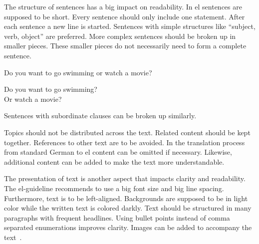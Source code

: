 The structure of sentences has a big impact on readability. %
In \gls{el} sentences are supposed to be short.
Every sentence should only include one statement.
After each sentence a new line is started.
Sentences with simple structures like \enquote{subject, verb, object} are preferred.
More complex sentences should be broken up in smaller pieces.
These smaller pieces do not necessarily need to form a complete sentence.
\begin{center}
    \colorbox{red!20}{
        \begin{minipage}{0.6\textwidth}
            Do you want to go swimming or watch a movie?
        \end{minipage}
    }
    \colorbox{green!20}{
        \begin{minipage}{0.6\textwidth}
            Do you want to go swimming? \\
            Or watch a movie?
        \end{minipage}
    }
\end{center}
Sentences with subordinate clauses can be broken up similarly.

Topics should not be distributed across the text.
Related content should be kept together.
References to other text are to be avoided.
In the translation process from standard German to \gls{el} content can be omitted if necessary.
Likewise, additional content can be added to make the text more understandable.

The presentation of text is another aspect that impacts clarity and readability.
The \gls{el}-guideline recommends to use a big font size and big line spacing.
Furthermore, text is to be left-aligned.
Backgrounds are supposed to be in light color while the written text is colored darkly.
Text should be structured in many paragraphs with frequent headlines.
Using bullet points instead of comma separated enumerations improves clarity.
Images can be added to accompany the text~\autocite{netzwerkLS}.









%
%
%
%
%
%
%

